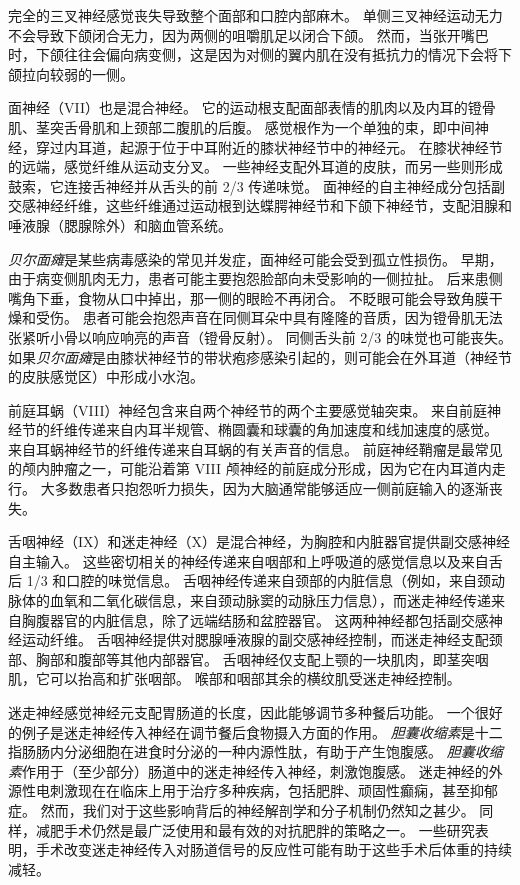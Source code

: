 完全的三叉神经感觉丧失导致整个面部和口腔内部麻木。
单侧三叉神经运动无力不会导致下颌闭合无力，因为两侧的咀嚼肌足以闭合下颌。
然而，当张开嘴巴时，下颌往往会偏向病变侧，这是因为对侧的翼内肌在没有抵抗力的情况下会将下颌拉向较弱的一侧。


面神经（VII）也是混合神经。
它的运动根支配面部表情的肌肉以及内耳的镫骨肌、茎突舌骨肌和上颈部二腹肌的后腹。
感觉根作为一个单独的束，即中间神经，穿过内耳道，起源于位于中耳附近的膝状神经节中的神经元。
在膝状神经节的远端，感觉纤维从运动支分叉。
一些神经支配外耳道的皮肤，而另一些则形成鼓索，它连接舌神经并从舌头的前 2/3 传递味觉。
面神经的自主神经成分包括副交感神经纤维，这些纤维通过运动根到达蝶腭神经节和下颌下神经节，支配泪腺和唾液腺（腮腺除外）和脑血管系统。


\textit{贝尔面瘫}是某些病毒感染的常见并发症，面神经可能会受到孤立性损伤。
早期，由于病变侧肌肉无力，患者可能主要抱怨脸部向未受影响的一侧拉扯。
后来患侧嘴角下垂，食物从口中掉出，那一侧的眼睑不再闭合。
不眨眼可能会导致角膜干燥和受伤。
患者可能会抱怨声音在同侧耳朵中具有隆隆的音质，因为镫骨肌无法张紧听小骨以响应响亮的声音（镫骨反射）。
同侧舌头前 2/3 的味觉也可能丧失。
如果\textit{贝尔面瘫}是由膝状神经节的带状疱疹感染引起的，则可能会在外耳道（神经节的皮肤感觉区）中形成小水泡。


前庭耳蜗（VIII）神经包含来自两个神经节的两个主要感觉轴突束。
来自前庭神经节的纤维传递来自内耳半规管、椭圆囊和球囊的角加速度和线加速度的感觉。
来自耳蜗神经节的纤维传递来自耳蜗的有关声音的信息。
前庭神经鞘瘤是最常见的颅内肿瘤之一，可能沿着第 VIII 颅神经的前庭成分形成，因为它在内耳道内走行。
大多数患者只抱怨听力损失，因为大脑通常能够适应一侧前庭输入的逐渐丧失。


舌咽神经（IX）和迷走神经（X）是混合神经，为胸腔和内脏器官提供副交感神经自主输入。
这些密切相关的神经传递来自咽部和上呼吸道的感觉信息以及来自舌后 1/3 和口腔的味觉信息。
舌咽神经传递来自颈部的内脏信息（例如，来自颈动脉体的血氧和二氧化碳信息，来自颈动脉窦的动脉压力信息），而迷走神经传递来自胸腹器官的内脏信息，除了远端结肠和盆腔器官。
这两种神经都包括副交感神经运动纤维。
舌咽神经提供对腮腺唾液腺的副交感神经控制，而迷走神经支配颈部、胸部和腹部等其他内部器官。
舌咽神经仅支配上颚的一块肌肉，即茎突咽肌，它可以抬高和扩张咽部。
喉部和咽部其余的横纹肌受迷走神经控制。


迷走神经感觉神经元支配胃肠道的长度，因此能够调节多种餐后功能。
一个很好的例子是迷走神经传入神经在调节餐后食物摄入方面的作用。
\textit{胆囊收缩素}是十二指肠肠内分泌细胞在进食时分泌的一种内源性肽，有助于产生饱腹感。
\textit{胆囊收缩素}作用于（至少部分）肠道中的迷走神经传入神经，刺激饱腹感。
迷走神经的外源性电刺激现在在临床上用于治疗多种疾病，包括肥胖、顽固性癫痫，甚至抑郁症。
然而，我们对于这些影响背后的神经解剖学和分子机制仍然知之甚少。
同样，减肥手术仍然是最广泛使用和最有效的对抗肥胖的策略之一。
一些研究表明，手术改变迷走神经传入对肠道信号的反应性可能有助于这些手术后体重的持续减轻。


